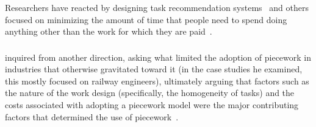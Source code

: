 \documentclass[trackingWork]{subfiles}
\begin{document}
Researchers have reacted by designing task recommendation systems~\cite[e.g.][]{Cosley:2007:SUI:1216295.1216309}
and others focused on
minimizing the amount of time that people need to spend doing anything other than
the work for which they are paid~\cite{callison2014crowd}.



\subsubsection{\pieceworkpers}
\citeauthor{Brown01041990} inquired from another direction,
asking
what limited the adoption of piecework in industries that otherwise gravitated toward it
(in the case studies he examined,
this mostly focused on railway engineers),
ultimately arguing that factors such as the nature of the work design
(specifically,
the homogeneity of tasks) and the costs associated with adopting a piecework model
were the major contributing factors that determined the use of piecework~\cite{Brown01041990}.




\end{document}
